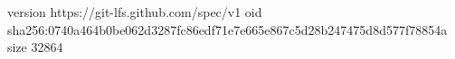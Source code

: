 version https://git-lfs.github.com/spec/v1
oid sha256:0740a464b0be062d3287fc86edf71e7e665e867c5d28b247475d8d577f78854a
size 32864
